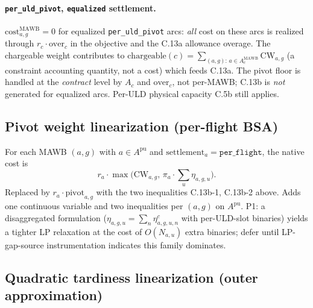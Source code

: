 \documentclass[11pt,a4paper]{article}
\theoremstyle{definition}
\begin{document}
\paragraph{\texttt{per\_uld\_pivot}, \texttt{equalized} settlement.}
$\text{cost}^{\text{MAWB}}_{a,g} = 0$ for equalized \texttt{per\_uld\_pivot}
arcs: \emph{all} cost on these arcs is realized through $r_c \cdot
\text{over}_c$ in the objective and the C.13a allowance overage. The
chargeable weight contributes to $\text{chargeable}(c) = \sum_{(a,g):\, a \in
A_c^{\text{MAWB}}} \text{CW}_{a,g}$ (a constraint accounting quantity, not a
cost) which feeds C.13a. The pivot floor is handled at the \emph{contract}
level by $A_c$ and $\text{over}_c$, not per-MAWB; C.13b is \emph{not}
generated for equalized arcs. Per-ULD physical capacity C.5b still applies.

\subsection{Pivot weight linearization (per-flight BSA) }
\label{sec:lin-pivot}

For each MAWB $(a, g)$ with $a \in A^{\text{pu}}$ and $\text{settlement}_a =
\texttt{per\_flight}$, the native cost is
\[
  r_a \cdot \max\bigl(\text{CW}_{a,g},\, \pi_a \cdot \sum_u \eta_{a,g,u}\bigr).
\]
Replaced by $r_a \cdot \text{pivot}_{a,g}$ with the two inequalities C.13b-1,
C.13b-2 above. Adds one continuous variable and two inequalities per
$(a, g)$ on $A^{\text{pu}}$. P1: a disaggregated formulation
($\eta_{a,g,u} = \sum_n \eta^c_{a,g,u,n}$ with per-ULD-slot binaries) yields
a tighter LP relaxation at the cost of $O(N_{a,u})$ extra binaries; defer
until LP-gap-source instrumentation indicates this family dominates.

\subsection{Quadratic tardiness linearization (outer approximation) }
\label{sec:lin-tardiness}
\end{document}

